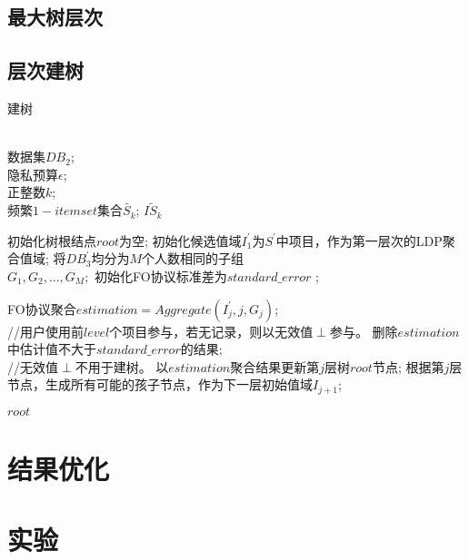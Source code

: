 \documentclass[UTF8]{ctexart}
\begin{document}
\subsection{最大树层次}
\label{section:MaxIter}

\subsection{层次建树}
\label{section:buildTree}

\begin{algorithm}[htbp]
\caption{建树}
\label{alg:bulid tree}
\begin{algorithmic}[1]
\REQUIRE ~~\\
数据集$DB_2$;\\
隐私预算$\epsilon$;\\
正整数$k$;\\
频繁$1-itemset$集合$\tilde{S_k}$;
\ENSURE $\tilde{IS_k}$

\STATE 初始化树根结点$root$为空;
\STATE 初始化候选值域$I^{\prime}_{1}$为$S^{\prime}$中项目，作为第一层次的LDP聚合值域;
\STATE 将$D B^{\prime}_{3}$均分为$M$个人数相同的子组~~\\
$G_{1},G_{2},...,G_{M};$
\STATE 初始化FO协议标准差为$standard\_error$ ;

    \STATE FO协议聚合$estimation = Aggregate(I^{\prime}_{j},j,G_{j})$;\\
    //用户使用前$level$个项目参与，若无记录，则以无效值$\perp$参与。
    \STATE 删除$estimation$中估计值不大于$standard\_error$的结果;\\
    //无效值$\perp$不用于建树。
    \STATE 以$estimation$聚合结果更新第$j$层树$root$节点;
    \STATE 根据第$j$层节点，生成所有可能的孩子节点，作为下一层初始值域$I_{j+1}$;
\ENDFOR

\RETURN $root$
\end{algorithmic}
\end{algorithm}

\section{结果优化}
\label{section:optimize}

\section{实验}
\end{document}
